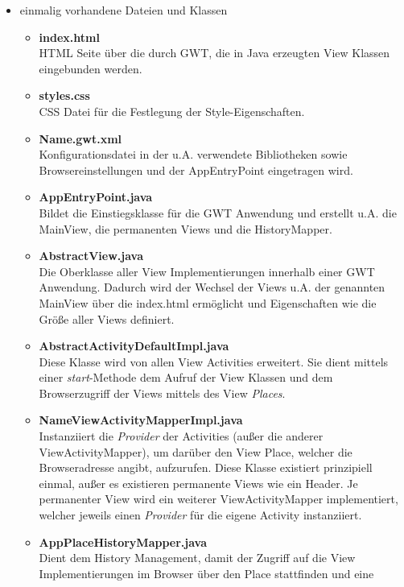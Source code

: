 \begin{itemize}
  \item einmalig vorhandene Dateien und Klassen
  \begin{itemize}
    \item \textbf{index.html}\\
    HTML Seite über die durch GWT, die in Java erzeugten View Klassen
    eingebunden werden.
    \item \textbf{styles.css}\\
    CSS Datei für die Festlegung der Style-Eigenschaften.
    \item \textbf{\grqq{}Name\grqq{}.gwt.xml}\\
    Konfigurationsdatei in der u.A. verwendete Bibliotheken sowie
    Browsereinstellungen und der AppEntryPoint eingetragen wird.
    \item \textbf{AppEntryPoint.java}\\
    Bildet die Einstiegsklasse für die GWT Anwendung und erstellt u.A. die
    MainView, die permanenten Views und die HistoryMapper.
    \item \textbf{AbstractView.java}\\
    Die Oberklasse aller View Implementierungen innerhalb einer GWT
    Anwendung. Dadurch wird der Wechsel der Views u.A. der genannten
    MainView über die index.html ermöglicht und Eigenschaften wie die Größe aller
    Views definiert.
    \item \textbf{AbstractActivityDefaultImpl.java}\\
    Diese Klasse wird von allen View Activities erweitert. Sie dient
    mittels einer \textit{start}-Methode dem Aufruf der View Klassen und
    dem Browserzugriff der Views mittels des View \textit{Places}.
    \item \textbf{\grqq{}Name\grqq{}ViewActivityMapperImpl.java}\\
    Instanziiert die \textit{Provider} der Activities (außer die anderer
    ViewActivityMapper), um darüber den View Place, welcher die
    Browseradresse angibt, aufzurufen. Diese Klasse existiert prinzipiell einmal, außer es existieren permanente Views wie ein Header. Je
    permanenter View wird ein weiterer ViewActivityMapper implementiert, welcher
    jeweils einen \textit{Provider} für die eigene Activity instanziiert.
    \item \textbf{AppPlaceHistoryMapper.java}\\
    Dient dem History Management, damit der Zugriff auf die View
    Implementierungen im Browser über den Place stattfinden und eine

\end{itemize}
\end{itemize}
